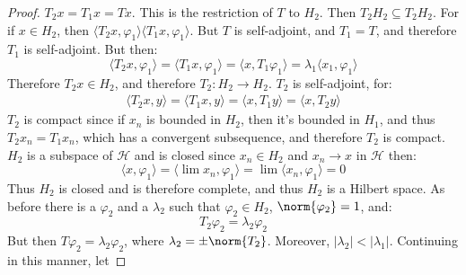 \begin{proof}
            $T_{2}x=T_{1}x=Tx$. This is the restriction
            of $T$ to $H_{2}$. Then
            $T_{2}H_{2}\subseteq{T}_{2}H_{2}$. For if
            $x\in{H}_{2}$, then
            $\langle{T}_{2}x,\varphi_{1}\rangle%
             \langle{T}_{1}x,\varphi_{1}\rangle$. But
            $T$ is self-adjoint, and
            $T_{1}=T$, and therefore
            $T_{1}$ is self-adjoint. But then:
            \begin{equation*}
                \langle{T}_{2}x,\varphi_{1}\rangle
                =\langle{T}_{1}x,\varphi_{1}\rangle
                =\langle{x},T_{1}\varphi_{1}\rangle
                =\lambda_{1}\langle{x}_{1},
                    \varphi_{1}\rangle
            \end{equation*}
            Therefore $T_{2}x\in{H}_{2}$, and therefore
            $T_{2}:H_{2}\rightarrow{H}_{2}$. $T_{2}$
            is self-adjoint, for:
            \begin{align*}
                \langle{T}_{2}x,y\rangle
                =\langle{T}_{1}x,y\rangle
                =\langle{x},T_{1}y\rangle
                =\langle{x},T_{2}y\rangle
            \end{align*}
            $T_{2}$ is compact since if $x_{n}$ is
            bounded in $H_{2}$, then it's bounded in
            $H_{1}$, and thus
            $T_{2}x_{n}=T_{1}x_{n}$, which has a convergent
            subsequence,
            and therefore $T_{2}$ is compact. $H_{2}$ is
            a subspace of $\mathscr{H}$ and is closed since
            $x_{n}\in{H}_{2}$ and
            $x_{n}\rightarrow{x}$ in $\mathscr{H}$ then:
            \begin{equation*}
                \langle{x},\varphi_{1}\rangle=
                \langle\lim{x}_{n},\varphi_{1}\rangle=
                \lim\langle{x}_{n},\varphi_{1}\rangle=
                0
            \end{equation*}
            Thus $H_{2}$ is closed and is therefore complete,
            and thus $H_{2}$ is a Hilbert space. As before
            there is a $\varphi_{2}$ and a $\lambda_{2}$
            such that $\varphi_{2}\in{H}_{2}$,
            $\norm{\varphi_{2}}=1$, and:
            \begin{equation*}
                T_{2}\varphi_{2}=\lambda_{2}\varphi_{2}
            \end{equation*}
            But then $T\varphi_{2}=\lambda_{2}\varphi_{2}$,
            where $\lambda_{2}=\pm\norm{T_{2}}$. Moreover,
            $|\lambda_{2}|<|\lambda_{1}|$. Continuing in
            this manner, let

\end{proof}
